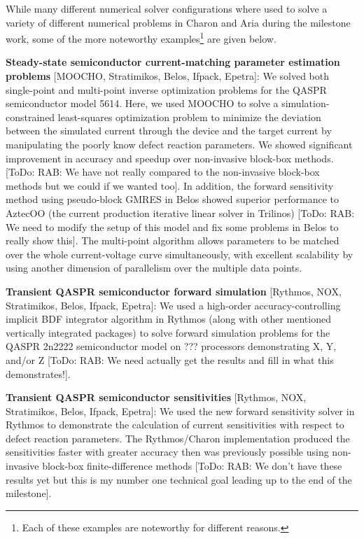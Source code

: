 \documentclass[pdf,ps2pdf,11pt]{SANDreport}
\begin{document}
While many different numerical solver configurations where used to solve a
variety of different numerical problems in Charon and Aria during the
milestone work, some of the more noteworthy examples\footnote{Each of these
examples are noteworthy for different reasons.} are given below.

{}\noindent\textbf{Steady-state semiconductor current-matching parameter
estimation problems} [MOOCHO, Stratimikos, Belos, Ifpack, Epetra]: We solved
both single-point and multi-point inverse optimization problems for the QASPR
semiconductor model 5614.  Here, we used MOOCHO to solve a
simulation-constrained least-squares optimization problem to minimize the
deviation between the simulated current through the device and the target
current by manipulating the poorly know defect reaction parameters.  We showed
significant improvement in accuracy and speedup over non-invasive block-box
methods. [ToDo: RAB: We have not really compared to the non-invasive block-box
methods but we could if we wanted too].  In addition, the forward sensitivity
method using pseudo-block GMRES in Belos showed superior performance to
AztecOO (the current production iterative linear solver in Trilinos) [ToDo:
RAB: We need to modify the setup of this model and fix some problems in Belos
to really show this]. The multi-point algorithm allows parameters to be matched
over the whole current-voltage curve simultaneously, with excellent scalability
by using another dimension of parallelism over the multiple data points.

{}\noindent\textbf{Transient QASPR semiconductor forward simulation} [Rythmos,
NOX, Stratimikos, Belos, Ifpack, Epetra]: We used a high-order
accuracy-controlling implicit BDF integrator algorithm in Rythmos (along with
other mentioned vertically integrated packages) to solve forward simulation
problems for the QASPR 2n2222 semiconductor model on ??? processors
demonstrating X, Y, and/or Z [ToDo: RAB: We need actually get the results and
fill in what this demonstrates!].
 
{}\noindent\textbf{Transient QASPR semiconductor sensitivities} [Rythmos, NOX,
Stratimikos, Belos, Ifpack, Epetra]: We used the new forward sensitivity
solver in Rythmos to demonstrate the calculation of current sensitivities with
respect to defect reaction parameters.  The Rythmos/Charon implementation
produced the sensitivities faster with greater accuracy then was previously
possible using non-invasive block-box finite-difference methods [ToDo: RAB: We
don't have these results yet but this is my number one technical goal leading
up to the end of the milestone].
 
\end{document}
